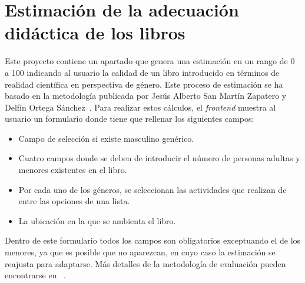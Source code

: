 \section{Estimación de la adecuación didáctica de los libros}
Este proyecto contiene un apartado que genera una estimación en un rango de 0 a 100 indicando al usuario la calidad de un libro introducido en términos de realidad científica en perspectiva de género. Este proceso de estimación se ha basado en la metodología publicada por Jesús Alberto San Martín Zapatero y Delfín Ortega Sánchez~\cite{san2022atribuciones}. Para realizar estos cálculos, el \textit{frontend} muestra al usuario un formulario donde tiene que rellenar los siguientes campos:
\begin{itemize}
    \item Campo de selección si existe masculino genérico.
    \item Cuatro campos donde se deben de introducir el número de personas adultas y menores existentes en el libro.
    \item Por cada uno de los géneros, se seleccionan las actividades que realizan de entre las opciones de una lista.
    \item La ubicación en la que se ambienta el libro.

\end{itemize}
Dentro de este formulario todos los campos son obligatorios exceptuando el de los menores, ya que es posible que no aparezcan, en cuyo caso la estimación se reajusta para adaptarse. Más detalles de la metodología de evaluación pueden encontrarse en ~\cite{san2022atribuciones}.

